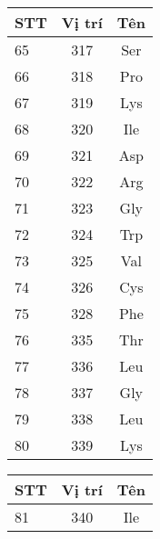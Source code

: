\begin{multicols}{3}
\begin{tabular}{l|c c}
\hline
STT & Vị trí & Tên \\
\hline
65 & 317& Ser \\
66 & 318& Pro \\
67 & 319& Lys \\
68 & 320& Ile \\
69 & 321& Asp \\
70 & 322& Arg \\
71 & 323& Gly \\
72 & 324& Trp \\
73 & 325& Val \\
74 & 326& Cys \\
75 & 328& Phe \\
76 & 335& Thr \\
77 & 336& Leu \\
78 & 337& Gly \\
79 & 338& Leu \\
80 & 339& Lys \\
\end{tabular}

\begin{tabular}{l|c c}
\hline
STT & Vị trí & Tên \\
\hline
81 & 340 & Ile \\
\end{tabular}
\end{multicols}
